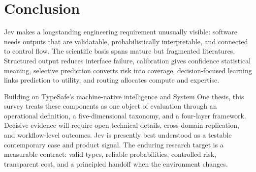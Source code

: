 \documentclass[11pt]{article}
\begin{document}
\section{Conclusion}

Jev makes a longstanding engineering requirement unusually visible: software needs outputs that are validatable, probabilistically interpretable, and connected to control flow. The scientific basis spans mature but fragmented literatures. Structured output reduces interface failure, calibration gives confidence statistical meaning, selective prediction converts risk into coverage, decision-focused learning links prediction to utility, and routing allocates compute and expertise.

Building on TypeSafe's machine-native intelligence and System One thesis, this survey treats these components as one object of evaluation through an operational definition, a five-dimensional taxonomy, and a four-layer framework. Decisive evidence will require open technical details, cross-domain replication, and workflow-level outcomes. Jev is presently best understood as a testable contemporary case and product signal. The enduring research target is a measurable contract: valid types, reliable probabilities, controlled risk, transparent cost, and a principled handoff when the environment changes.



\end{document}

